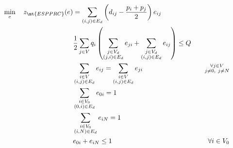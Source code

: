 \begin{align}
	\min_{e} \quad z_\mt{ESPPRC}(e) & =  \sum_{(i, j) \in E_d} \left( d_{ij} - \frac{p_i + p_j}{2} \right) e_{ij} \label{eq:espprc-obj-function}                                                                                 \\
	                                & \frac{1}{2}\sum_{j \in V} q_i \left( \sum_{\substack{j \in V_d                                                                                                                             \\ (j, i) \in E_d}} e_{ji} + \sum_{\substack{j \in V_d \\ (i, j) \in E_d}} e_{ij}  \right)   \le Q                                                                             & \label{eq:espprc-resource-upper-bound-constraint}                             \\
	                                & \sum_{\substack{i \in V                                                                                                                                                                    \\ (i, j) \in E_d}}       e_{ij}  = \sum_{\substack{i \in V \\ (i, j) \in E_d}} e_{ji}                                                       & \quad \substack{\forall j \in V                                             \\ j \ne 0,\ j \ne N}         \label{eq:espprc-flow-conservation-constraint-customers} \\
	                                & \sum_{\substack{i \in V_0                                                                                                                                                                  \\ (0, i) \in E_d}} e_{0i} = 1 & \label{eq:espprc-flow-conservation-constraint-depot1} \\
	                                & \sum_{\substack{i \in V_0                                                                                                                                                                  \\ (i, N) \in E_d}} e_{iN} = 1 & \label{eq:espprc-flow-conservation-constraint-depot2} \\
	                                & e_{0i} + e_{iN} \le 1                                                                                      & \quad \forall i \in V_0 \label{eq:espprc-cptp-binding}                        \\

\end{align}

